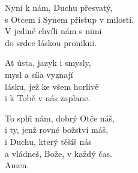 \begin{translatioMulticol}{3}
Nyní k nám, Duchu přesvatý,\\
s Otcem i Synem přistup v milosti.\\
V jediné chvíli nám s nimi\\
do srdce láskou pronikni.\columnbreak

Ať ústa, jazyk i smysly,\\
mysl a síla vyznají\\
lásku, jež ke všem horlivě\\
i k Tobě v nás zaplane.\columnbreak

To splň nám, dobrý Otče náš,\\
i ty, jenž rovné božství máš,\\
i Duchu, který těšíš nás\\
a vládneš, Bože, v každý čas.\\
Amen.
\end{translatioMulticol}
